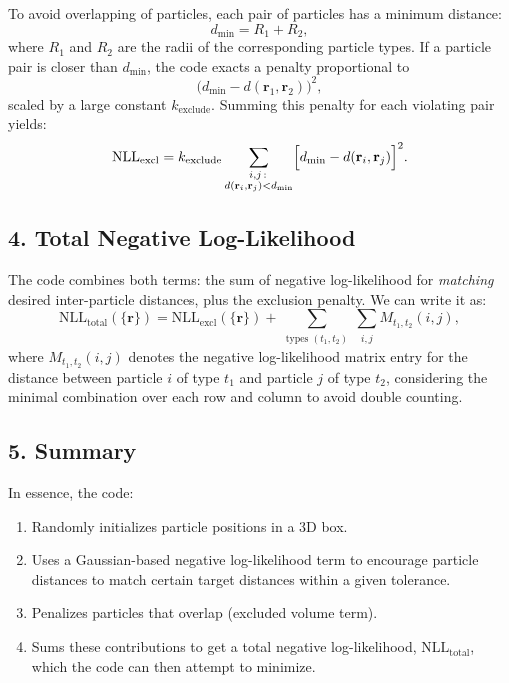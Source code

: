 \documentclass[12pt]{article}
\begin{document}
To avoid overlapping of particles, each pair of particles has a minimum distance:
\[
d_{\mathrm{min}} = R_1 + R_2,
\]
where $R_1$ and $R_2$ are the radii of the corresponding particle types. If a particle pair is closer than $d_{\mathrm{min}}$, the code exacts a penalty proportional to
\[
\bigl(d_{\mathrm{min}} - d(\mathbf{r}_1,\mathbf{r}_2)\bigr)^2,
\]
scaled by a large constant $k_{\mathrm{exclude}}$. Summing this penalty for each violating pair yields:
\[
\mathrm{NLL}_{\mathrm{excl}} = k_{\mathrm{exclude}} \sum_{\substack{i,j\,:\,\\ d(\mathbf{r}_{i}, \mathbf{r}_{j}) < d_{\mathrm{min}}}} 
\Bigl[d_{\mathrm{min}} - d(\mathbf{r}_{i}, \mathbf{r}_{j})\Bigr]^2.
\]

\subsection*{4. Total Negative Log-Likelihood}

The code combines both terms: the sum of negative log-likelihood for \emph{matching} desired inter-particle distances, plus the exclusion penalty. We can write it as:
\[
\mathrm{NLL}_{\mathrm{total}}(\{\mathbf{r}\}) 
= \mathrm{NLL}_{\mathrm{excl}}(\{\mathbf{r}\}) 
+ \sum_{\substack{\text{types }(t_1, t_2)}} 
\sum_{\substack{i,j}}\! M_{t_1,t_2}(i,j),
\]
where $M_{t_1,t_2}(i,j)$ denotes the negative log-likelihood matrix entry for the distance between particle $i$ of type $t_1$ and particle $j$ of type $t_2$, considering the minimal combination over each row and column to avoid double counting.

\subsection*{5. Summary}

In essence, the code:

\begin{enumerate}
\item Randomly initializes particle positions in a 3D box. 
\item Uses a Gaussian-based negative log-likelihood term to encourage particle distances to match certain target distances within a given tolerance.
\item Penalizes particles that overlap (excluded volume term).
\item Sums these contributions to get a total negative log-likelihood, \(\mathrm{NLL}_{\mathrm{total}}\), which the code can then attempt to minimize.
\end{enumerate}
\end{document}
